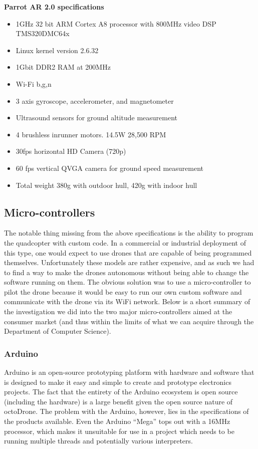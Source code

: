 \begin{aside}
\textbf{Parrot AR 2.0 specifications\cite{parrotspecs}}
\begin{itemize}
\item 1GHz 32 bit ARM Cortex A8 processor with 800MHz video DSP TMS320DMC64x
\item Linux kernel version 2.6.32
\item 1Gbit DDR2 RAM at 200MHz
\item Wi-Fi b,g,n
\item 3 axis gyroscope, accelerometer, and magnetometer
\item Ultrasound sensors for ground altitude measurement
\item 4 brushless inrunner motors. 14.5W 28,500 RPM
\item 30fps horizontal HD Camera (720p)
\item 60 fps vertical QVGA camera for ground speed measurement
\item Total weight 380g with outdoor hull, 420g with indoor hull
\end{itemize}
\end{aside}

\subsection{Micro-controllers}
The notable thing missing from the above specifications is the ability to program the quadcopter with custom code. In a commercial or industrial deployment of this type, one would expect to use drones that are capable of being programmed themselves. Unfortunately these models are rather expensive, and as such we had to find a way to make the drones autonomous without being able to change the software running on them. The obvious solution was to use a micro-controller to pilot the drone because it would be easy to run our own custom software and communicate with the drone via its WiFi network. Below is a short summary of the investigation we did into the two major micro-controllers aimed at the consumer market (and thus within the limits of what we can acquire through the Department of Computer Science).

\subsubsection{Arduino}
Arduino is an open-source prototyping platform with hardware and software that is designed to make it easy and simple to create and prototype electronics projects\cite{arduinoguide}. The fact that the entirety of the Arduino ecosystem is open source (including the hardware) is a large benefit given the open source nature of octoDrone. The problem with the Arduino, however, lies in the specifications of the products available. Even the Arduino ``Mega'' tops out with a 16MHz processor, which makes it unsuitable for use in a project which needs to be running multiple threads and potentially various interpreters.

